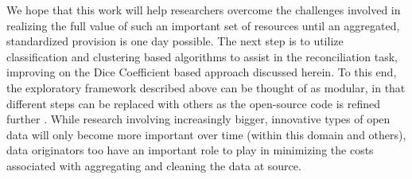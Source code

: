 \documentclass[12pt]{article}
\begin{document}
We hope that this work will help researchers overcome the challenges involved in realizing the full value of such an important set of resources until an aggregated, standardized provision is one day possible. The next step is to utilize classification and clustering based algorithms to assist in the reconciliation task, improving on the Dice Coefficient based approach discussed herein. To this end, the exploratory framework described above can be thought of as modular, in that different steps can be replaced with others as the open-source code is refined further \cite[such as a methodological advancement similar to][]{imai2017}. While research involving increasingly bigger, innovative types of open data will only become more important over time (within this domain and others), data originators too have an important role to play in minimizing the costs associated with aggregating and cleaning the data at source.

\small


\label{sec:Bibliography}
\end{document}
